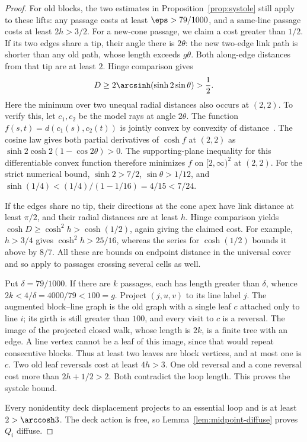 \begin{proof}
For old blocks, the two estimates in
Proposition~\ref{prop:systole} still apply to these lifts: any passage
costs at least \(\eps>79/1000\), and a same-line passage costs at
least \(2h>3/2\). For a new-cone passage, we claim a cost greater
than \(1/2\). If its two edges share a tip, their angle there is
\(2\theta\): the new two-edge link path is shorter than any old
path, whose length exceeds \(g\theta\). Both along-edge distances
from that tip are at least \(2\). Hinge comparison gives
\begin{equation}\label{eq:cone-hinge}
 D\ge2\arcsinh(\sinh2\sin\theta)>\frac12.
\end{equation}
Here the minimum over two unequal radial distances also occurs at
\((2,2)\). To verify this, let \(c_1,c_2\) be the model rays at angle
\(2\theta\). The function \(f(s,t)=d(c_1(s),c_2(t))\) is jointly
convex by convexity of distance~\cite[Proposition~II.2.2]{BH}.
The cosine law gives both partial derivatives of \(\cosh f\) at
\((2,2)\) as \(\sinh2\cosh2(1-\cos2\theta)>0\).
The supporting-plane inequality for this differentiable convex
function therefore minimizes \(f\) on \([2,\infty)^2\) at \((2,2)\).
For the strict numerical bound, \(\sinh2>7/2\),
\(\sin\theta>1/12\), and
\(\sinh(1/4)<(1/4)/(1-1/16)=4/15<7/24\).

If the edges share no tip, their directions at the cone apex have
link distance at least \(\pi/2\), and their radial distances are at
least \(h\). Hinge comparison yields
\(\cosh D\ge\cosh^2h>\cosh(1/2)\), again giving the claimed cost.
For example, \(h>3/4\) gives \(\cosh^2h>25/16\), whereas the series
for \(\cosh(1/2)\) bounds it above by \(8/7\). All these are bounds
on endpoint distance in the universal cover and so apply to passages
crossing several cells as well.

Put \(\delta=79/1000\). If there are \(k\) passages, each has length
greater than \(\delta\), whence \(2k<4/\delta=4000/79<100=g\).
Project \((j,u,v)\) to its line label \(j\). The augmented block--line
graph is the old graph with a single leaf \(c\) attached only to
line \(i\); its girth is still greater than \(100\), and every visit
to \(c\) is a reversal. The image of the projected closed walk,
whose length is \(2k\), is a finite tree with an edge. A line vertex
cannot be a leaf of this image, since that would repeat consecutive
blocks. Thus at least two leaves are block vertices, and at most one
is \(c\). Two old leaf reversals cost at least \(4h>3\). One old
reversal and a cone reversal cost more than \(2h+1/2>2\).
Both contradict the loop length. This proves the systole bound.

Every nonidentity deck displacement projects to an essential loop
and is at least \(2>\arccosh3\). The deck action is free, so
Lemma~\ref{lem:midpoint-diffuse} proves \(Q_i\) diffuse.
\end{proof}

